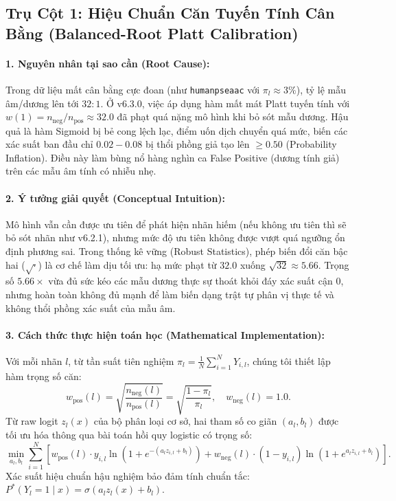\documentclass[10pt,a4paper,twoside]{article}
\begin{document}
\subsection{Trụ Cột 1: Hiệu Chuẩn Căn Tuyến Tính Cân Bằng (Balanced-Root Platt Calibration)}
\paragraph{1. Nguyên nhân tại sao cần (Root Cause):}
Trong dữ liệu mất cân bằng cực đoan (như \texttt{humanpseaac} với $\pi_l \approx 3\%$), tỷ lệ mẫu âm/dương lên tới $32:1$. Ở v6.3.0, việc áp dụng hàm mất mát Platt tuyến tính với $w(1) = n_{\text{neg}}/n_{\text{pos}} \approx 32.0$ đã phạt quá nặng mô hình khi bỏ sót mẫu dương. Hậu quả là hàm Sigmoid bị bẻ cong lệch lạc, điểm uốn dịch chuyển quá mức, biến các xác suất ban đầu chỉ $0.02 - 0.08$ bị thổi phồng giả tạo lên $\ge 0.50$ (Probability Inflation). Điều này làm bùng nổ hàng nghìn ca False Positive (dương tính giả) trên các mẫu âm tính có nhiễu nhẹ.

\paragraph{2. Ý tưởng giải quyết (Conceptual Intuition):}
Mô hình vẫn cần được ưu tiên để phát hiện nhãn hiếm (nếu không ưu tiên thì sẽ bỏ sót nhãn như v6.2.1), nhưng mức độ ưu tiên không được vượt quá ngưỡng ổn định phương sai. Trong thống kê vững (Robust Statistics), phép biến đổi căn bậc hai ($\sqrt{\cdot}$) là cơ chế làm dịu tối ưu: hạ mức phạt từ $32.0$ xuống $\sqrt{32} \approx 5.66$. Trọng số $5.66\times$ vừa đủ sức kéo các mẫu dương thực sự thoát khỏi đáy xác suất cận $0$, nhưng hoàn toàn không đủ mạnh để làm biến dạng trật tự phân vị thực tế và không thổi phồng xác suất của mẫu âm.

\paragraph{3. Cách thức thực hiện toán học (Mathematical Implementation):}
Với mỗi nhãn $l$, từ tần suất tiên nghiệm $\pi_l = \frac{1}{N}\sum_{i=1}^N Y_{i, l}$, chúng tôi thiết lập hàm trọng số căn:
\begin{equation}
w_{\text{pos}}(l) = \sqrt{\frac{n_{\text{neg}}(l)}{n_{\text{pos}}(l)}} = \sqrt{\frac{1 - \pi_l}{\pi_l}}, \quad w_{\text{neg}}(l) = 1.0.
\label{eq:sqrt_platt}
\end{equation}
Từ raw logit $z_l(x)$ của bộ phân loại cơ sở, hai tham số co giãn $(a_l, b_l)$ được tối ưu hóa thông qua bài toán hồi quy logistic có trọng số:
\begin{equation}
\min_{a_l, b_l} \sum_{i=1}^N \left[ w_{\text{pos}}(l) \cdot y_{i, l} \ln\left(1 + e^{-(a_l z_{i, l} + b_l)}\right) + w_{\text{neg}}(l) \cdot (1 - y_{i, l}) \ln\left(1 + e^{a_l z_{i, l} + b_l}\right) \right].
\end{equation}
Xác suất hiệu chuẩn hậu nghiệm bảo đảm tính chuẩn tắc: $P^*(Y_l = 1 \mid x) = \sigma(a_l z_l(x) + b_l)$.
\end{document}
